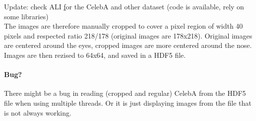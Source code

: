 \documentclass[11pt,a4paper]{article}
\begin{document}
Update: check ALI \href{https://ishmaelbelghazi.github.io/ALI/} for the CelebA and other dataset (code is available, rely on some libraries) \\

The images are therefore manually cropped to cover a  pixel region
of width 40 pixels and respected ratio 218/178 (original images are 178x218).
Original images are centered around the eyes, cropped images are more centered
around the nose. \\

Images are then rezised to 64x64, and saved in a HDF5 file.


\paragraph{Bug?} There might be a bug in reading (cropped and regular) CelebA from the HDF5 file when using multiple threads. Or it is just displaying images from the file that is not always working.



\printbibliography{}
\end{document}
